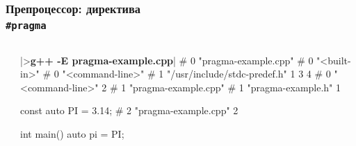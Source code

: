 \documentclass[compress]{beamer}
\newcommand{\shellprompt}{>}
\newcommand{\shellcommand}[1]{\shellprompt \space \textbf{#1}}
\begin{document}
\begin{frame}[fragile]

    \frametitle{Препроцессор: директива \\ \texttt{\#pragma}}

    \begin{columns}[T]

        \begin{column}{0.5\textwidth}



        \end{column}

        \begin{column}{0.5\textwidth}

            \begin{ConsoleWindow}
|\shellcommand{g++ -E pragma-example.cpp}|
# 0 "pragma-example.cpp"
# 0 "<built-in>"
# 0 "<command-line>"
# 1 "/usr/include/stdc-predef.h" 1 3 4
# 0 "<command-line>" 2
# 1 "pragma-example.cpp"
# 1 "pragma-example.h" 1


const auto PI = 3.14;
# 2 "pragma-example.cpp" 2




int main() {
    auto pi = PI;
}
            \end{ConsoleWindow}

        \end{column}

    \end{columns}

\end{frame}
\end{document}
